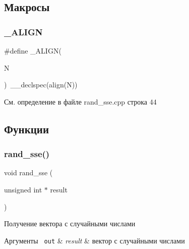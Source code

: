 \subsection{Макросы}
\mbox{\label{group__rand__ssecpp_gae2c66d1d7db5adf0c1853960e2be1119}} 
\subsubsection{\texorpdfstring{\_ALIGN}{\_ALIGN}}
{\footnotesize\ttfamily \#define \+\_\+\+A\+L\+I\+GN(\begin{DoxyParamCaption}\item[{}]{N }\end{DoxyParamCaption})~\+\_\+\+\_\+declspec(align(N))}



См. определение в файле rand\+\_\+sse.\+cpp строка 44



\subsection{Функции}
\mbox{\label{group__rand__ssecpp_gab7ae3ab6c8fb3e31548413dd0154db7d}} 
\subsubsection{\texorpdfstring{rand\_sse()}{rand\_sse()}}
{\footnotesize\ttfamily void rand\+\_\+sse (\begin{DoxyParamCaption}\item[{unsigned int $\ast$}]{result }\end{DoxyParamCaption})}



Получение вектора с случайными числами 


\begin{DoxyCode}{0}
\end{DoxyCode}
 
\begin{DoxyParams}[1]{Аргументы}
\mbox{\texttt{ out}}  & {\em result} & вектор с случайными числами \\
\hline
\end{DoxyParams}


